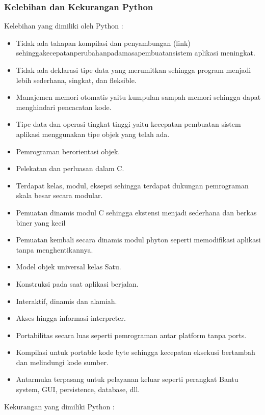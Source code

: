 \subsubsection{Kelebihan dan Kekurangan Python}
Kelebihan yang dimiliki oleh Python :
	\begin{itemize}
		\item Tidak ada tahapan kompilasi dan penyambungan (link) sehinggakecepatanperubahanpadamasapembuatansistem aplikasi 	meningkat. 
		\item Tidak ada deklarasi tipe data yang merumitkan sehingga program menjadi lebih sederhana, singkat, dan ﬂeksible. 
		\item Manajemen memori otomatis yaitu kumpulan sampah memori sehingga dapat menghindari pencacatan kode. 
		\item Tipe data dan operasi tingkat tinggi yaitu kecepatan pembuatan sistem aplikasi menggunakan tipe objek yang telah ada. 
		\item Pemrograman berorientasi objek.
		\item Pelekatan dan perluasan dalam C. 
		\item Terdapat kelas, modul, eksepsi sehingga terdapat dukungan pemrograman skala besar secara modular.
		\item Pemuatan dinamis modul C sehingga ekstensi menjadi sederhana dan berkas biner yang kecil 
		\item Pemuatan kembali secara dinamis modul phyton seperti memodiﬁkasi aplikasi tanpa menghentikannya. 
		\item Model objek universal kelas Satu. 
		\item Konstruksi pada saat aplikasi berjalan.
		\item Interaktif, dinamis dan alamiah. 
		\item Akses hingga informasi interpreter. 
		\item Portabilitas secara luas seperti pemrograman antar platform tanpa ports. 
		\item Kompilasi untuk portable kode byte sehingga kecepatan eksekusi bertambah dan melindungi kode sumber.
		\item Antarmuka terpasang untuk pelayanan keluar seperti perangkat Bantu system, GUI, persistence, database, dll. 
	\end{itemize}
Kekurangan yang dimiliki Python :
